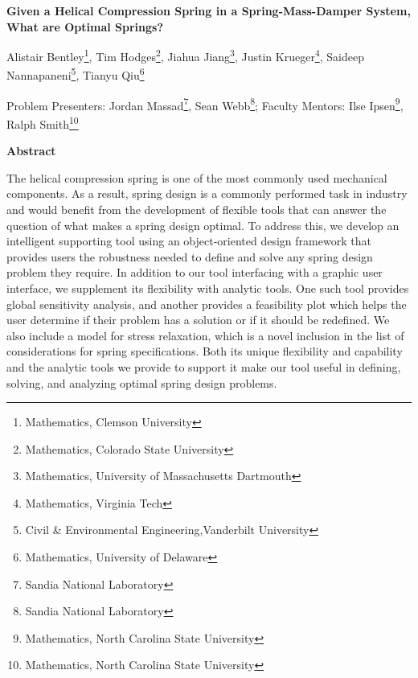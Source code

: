 \documentclass[10pt]{article}
\begin{document}
\centerline{\large \bf Given a Helical Compression Spring in a Spring-Mass-Damper System, What are Optimal Springs?}

\vspace{.1truein}

\def\thefootnote{\arabic{footnote}}
\begin{center}
  
  Alistair Bentley\footnote{Mathematics, Clemson University},
   Tim Hodges\footnote{Mathematics, Colorado State University},
   Jiahua Jiang\footnote{Mathematics, University of Massachusetts Dartmouth },
  Justin Krueger\footnote{Mathematics, Virginia Tech},
  Saideep Nannapaneni\footnote{Civil \& Environmental Engineering,Vanderbilt University},
  Tianyu Qiu\footnote{Mathematics, University of Delaware}
   
\end{center}



\begin{center}
Problem Presenters: Jordan Massad\footnote{Sandia National Laboratory},
Sean Webb\footnote{Sandia National Laboratory};
	Faculty Mentors: Ilse Ipsen\footnote{Mathematics, North Carolina State University},
	Ralph Smith\footnote{Mathematics, North Carolina State University} 
\end{center}

\vspace{.3truein}
\centerline{\bf Abstract}

The helical compression spring is one of the most commonly used mechanical components. As a result, spring design is a commonly performed task in industry and would benefit from the development of flexible tools that can answer the question of what makes a spring design optimal. To address this, we develop an intelligent supporting tool using an object-oriented design framework that provides users the robustness needed to define and solve any spring design problem they require. In addition to our tool interfacing with a graphic user interface, we supplement its flexibility with analytic tools. One such tool provides global sensitivity analysis, and another provides a feasibility plot which helps the user determine if their problem has a solution or if it should be redefined. We also include a model for stress relaxation, which is a novel inclusion in the list of considerations for spring specifications. Both its unique flexibility and capability and the analytic tools we provide to support it make our tool useful in defining, solving, and analyzing optimal spring design problems. 
\end{document}
